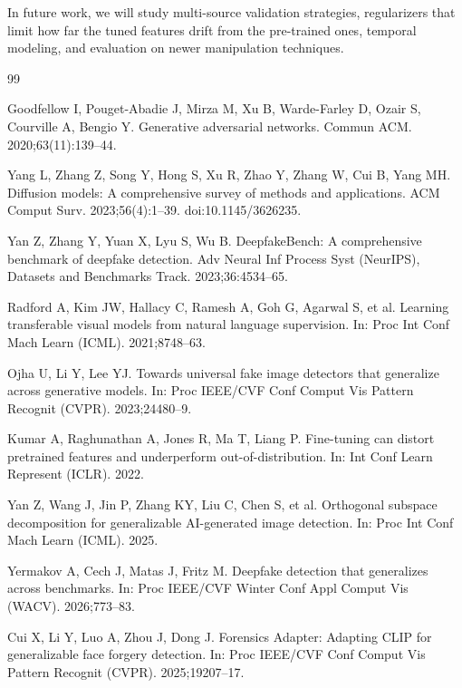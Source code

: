 \documentclass[fonts]{icst}
\begin{document}
In future work, we will study multi-source validation strategies, regularizers that limit how far the tuned features drift from the pre-trained ones, temporal modeling, and evaluation on newer manipulation techniques.


\begin{thebibliography}{99}
\balance

Goodfellow I, Pouget-Abadie J, Mirza M, Xu B, Warde-Farley D, Ozair S, Courville A, Bengio Y.
Generative adversarial networks.
Commun ACM. 2020;63(11):139--44.

Yang L, Zhang Z, Song Y, Hong S, Xu R, Zhao Y, Zhang W, Cui B, Yang MH.
Diffusion models: A comprehensive survey of methods and applications.
ACM Comput Surv. 2023;56(4):1--39. doi:10.1145/3626235.

Yan Z, Zhang Y, Yuan X, Lyu S, Wu B.
DeepfakeBench: A comprehensive benchmark of deepfake detection.
Adv Neural Inf Process Syst (NeurIPS), Datasets and Benchmarks Track. 2023;36:4534--65.

Radford A, Kim JW, Hallacy C, Ramesh A, Goh G, Agarwal S, et al.
Learning transferable visual models from natural language supervision.
In: Proc Int Conf Mach Learn (ICML). 2021;8748--63.

Ojha U, Li Y, Lee YJ.
Towards universal fake image detectors that generalize across generative models.
In: Proc IEEE/CVF Conf Comput Vis Pattern Recognit (CVPR). 2023;24480--9.

Kumar A, Raghunathan A, Jones R, Ma T, Liang P.
Fine-tuning can distort pretrained features and underperform out-of-distribution.
In: Int Conf Learn Represent (ICLR). 2022.

Yan Z, Wang J, Jin P, Zhang KY, Liu C, Chen S, et al.
Orthogonal subspace decomposition for generalizable AI-generated image detection.
In: Proc Int Conf Mach Learn (ICML). 2025.

Yermakov A, Cech J, Matas J, Fritz M.
Deepfake detection that generalizes across benchmarks.
In: Proc IEEE/CVF Winter Conf Appl Comput Vis (WACV). 2026;773--83.

Cui X, Li Y, Luo A, Zhou J, Dong J.
Forensics Adapter: Adapting CLIP for generalizable face forgery detection.
In: Proc IEEE/CVF Conf Comput Vis Pattern Recognit (CVPR). 2025;19207--17.


\end{thebibliography}
\end{document}
